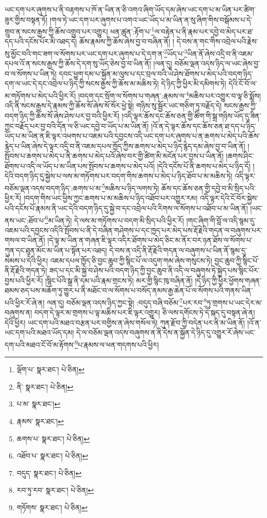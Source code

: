 ཡང་དག་པར་ཞུགས་པ་ནི་བརྟགས་པ་ཁོ་ན་ཡིན་ན་ཅི་འགའ་ཞིག་ཡོད་དམ་ཞེས་ཡང་དག་པ་མ་ཡིན་པར་ཚིག་ཟུར་གྱིས་བསྟན་ཏོ། །གལ་ཏེ་ཡང་དག་པར་ཞུགས་པ་འགའ་ཡང་ཡོད་པ་མ་ཡིན་ན་སུ་ཞིག་གིས་བསྒོམས་པ་དེ་གྲུབ་ན་སངས་རྒྱས་ཀྱི་ཆོས་འགྲུབ་པར་འགྱུར། ཕན་ཚུན་:རྟོག་པ་\footnote{ལྡོག་པ་  སྣར་ཐང་།  པེ་ཅིན། }ལ་བརྟེན་པ་ནི་རྣམ་པར་དབྱེ་བ་མེད་པར་ཐ་དད་པའི་དངོས་པོར་མི་འཐད་དེ། ཆོས་རྣམས་ཀྱི་ཆོས་ཞེས་བྱ་བ་བཞིན་ནོ། །
དེ་བས་ན་གང་གིས་འབྲེལ་པའི་རྗེས་སུ་མྱོང་བའི་གང་ཟག་ལ་སོགས་པར་ཡང་དག་པར་ཞུགས་པ་དེ་དག་ན་\footnote{ནི་  སྣར་ཐང་།  པེ་ཅིན། }ཡོད་པ་\footnote{པ་མ་  སྣར་ཐང་། }ཡིན་ནོ་ཞེས་འདྲི་བ་ནི་འཇམ་དཔལ་འོ་ན་སངས་རྒྱས་ཀྱི་ཆོས་དེ་དག་སུ་ཡོད་ཅེས་བྱ་བ་ཡིན་ནོ། །ལན་དུ། བཅོམ་ལྡན་འདས་ཉིད་ལ་ཡང་ཞེས་བྱ་བ་ལ་སོགས་པ་ཡིན་ཏེ། དབང་ཕྱུག་དམ་པ་སྐྱོན་མ་ལུས་པ་དང་བྲལ་བའི་ཡེ་ཤེས་ཐོགས་པ་མེད་པའི་བདག་ཉིད་དག་ལ་ཡང་དེ་དང་འབྲེལ་པ་ཉིད་ཀྱི་སངས་རྒྱས་ཀྱི་ཆོས་མ་མཆིས་ཏེ། དེ་ཉིད་ཀྱི་ཕྱིར་མི་དམིགས་ཏེ། དེའི་ངོ་བོ་ལ་མ་གཏོགས་པ་མེད་པའི་ཕྱིར་རོ། །བདག་དང་སྲོག་ལ་སོགས་པ་གཞན་:རྣམས་ལ་\footnote{རྣམས་  སྣར་ཐང་། }མཆིས་པར་འགྱུར་བ་ལྟ་ཅི་སྨོས། འདི་ནི་སངས་རྒྱས་དེ་རྣམས་ཀྱི་ཆོས་སོ་ཞེས་སོ་སོར་ཕྱེ་སྟེ། གཉིས་སུ་སྦྱོར་ཡང་གཅིག་ཏུ་བརྗོད་དེ། སངས་རྒྱས་ཀྱི་བདག་ཉིད་ཀྱི་ཆོས་སོ་ཞེས་ཤེས་པར་བྱ་བའི་ཕྱིར་རོ། །འདི་ལྟར་ཆོས་དང་ཆོས་ཅན་གྱི་ཚིག་གི་སྒྲ་གཉིས་ཡོད་དུ་ཟིན་ཀྱང་བརྗོད་པར་བྱ་བའི་དོན་ལ་ཅི་ཡང་དབྱེ་བ་ཡོད་པ་མ་ཡིན་ནོ། །འོ་ན་དེ་ལྟར་ཆོས་དང་ཆོས་ཅན་ཐ་དད་པ་ཉིད་ཡོད་པ་མ་ཡིན་ན་ཇི་ལྟར་འཕགས་པ་འཇམ་པའི་དབྱངས་འདི་ཡང་དག་པར་ཞུགས་པ་ན་ཆགས་པ་མེད་པའི་ཆོས་རྙེད་པ་ཡིན་ཞེས་དེ་ལྟར་འདྲི་བ་ནི་འཇམ་དཔལ་ཁྱོད་ཀྱིས་ཆགས་པ་མེད་པ་ཉིད་རྙེད་དམ་ཞེས་བྱ་བ་ཡིན་ནོ། །སྤོབས་པ་ཆགས་པ་མེད་པ་ནི་ཆགས་པ་མེད་པའོ་ཞེས་བར་གྱི་ཚིག་མི་མངོན་པར་བྱས་པ་ཡིན་ནོ། །ཆགས་ཤིང་ཐོགས་པ་འདི་ལ་ཡོད་པ་མ་ཡིན་པས་སྤོབས་པ་ཆགས་པ་མེད་པའོ། །དེའི་དངོས་པོ་ནི་ཆགས་པ་མེད་པ་ཉིད་དོ། །དེའི་བདག་ཉིད་དུ་སྐྱེས་པ་ལས་མ་གཏོགས་པར་བདག་གིས་ཆགས་པ་མེད་པ་ཉིད་ཐོབ་པ་མ་མཆིས་ཏེ། འདི་ལྟར་བཅོམ་ལྡན་འདས་བདག་ཉིད་:ཆགས་པ་མ་\footnote{ཆགས་པ་  སྣར་ཐང་།  པེ་ཅིན། }མཆིས་པ་ཉིད་ལགས་ཏེ། ཆོས་དང་ཆོས་ཅན་གྱི་དབྱེ་བ་མི་སྲིད་པའི་ཕྱིར་རོ། །བདག་གིས་ཡང་ཕྱིས་ཀྱང་ཆགས་པ་མ་མཆིས་པ་ཉིད་འཐོབ་པར་འགྱུར་རམ། འདི་ལྟར་དེའི་ངོ་བོར་སྐྱེས་པའི་དངོས་པོ་རྣམས་ནི་ཡང་དེའི་བདག་ཉིད་དུ་སྐྱེ་བ་དང་འབྲེལ་པའི་རིགས་ལ་སོགས་པ་འཐོབ་པ་མ་ཡིན་ནོ། །ཡང་ནས་ཡང་:ཐོབ་པ་\footnote{འཐོབ་པ་  སྣར་ཐང་།  པེ་ཅིན། }མ་ཡིན་ཏེ། དེ་ལས་མ་གཏོགས་པ་བདག་མི་སྲིད་པའི་ཕྱིར་རོ། །གང་ཞིག་གི་བློ་ལ་འདི་སྙམ་དུ་འཇམ་པའི་དབྱངས་འདིའི་སྤོབས་པ་ནི་དེ་བཞིན་གཤེགས་པ་དང་ཁྱད་པར་མེད་པས་རྡོ་རྗེའི་གདན་ལ་བཞུགས་པར་གསལ་བ་ཡིན་ནོ། །དེ་ལྟ་མ་ཡིན་ན་གཞན་ཇི་ལྟར་འདིར་ཐོགས་པ་མེད་ཅིང་མ་ནོར་བར་ཉན་ཐོས་ལ་སོགས་པ་ཀུན་དང་ཐུན་མོང་མ་ཡིན་པ་སྟོན་པར་འཐད། དེ་བས་ན་འདི་ནི་རྡོ་རྗེའི་གདན་ལ་བཞུགས་པ་ཡིན་ནོ་སྙམ་དུ་སེམས་པ་དེའི་ཕྱིར། འཇམ་དཔལ་ཁྱོད་ཅི་བྱང་ཆུབ་ཀྱི་སྙིང་པོ་ལ་འདུག་གམ་ཞེས་གསུངས་ཏེ། བྱང་ཆུབ་ཀྱི་སྙིང་པོ་ནི་རྡོ་རྗེའི་གདན་ཏེ། ཟད་པ་དང་མི་སྐྱེ་བ་ཤེས་པའི་བདག་ཉིད་ཀྱི་བྱང་ཆུབ་ནི་འདི་ལ་བཞུགས་ཏེ་སྐྱེད་པས་སྙིང་པོར་བྱས་པའི་ཕྱིར་རོ། །སྙིང་པོའི་སྒྲ་ནི་དམ་པའི་རྣམ་གྲངས་ཏེ། མར་གྱི་སྙིང་ཁུ་བཞིན་ནོ། །དེ་ཉིད་ཀྱི་ཕྱིར་ཕྱོགས་གཞན་ཐམས་ཅད་པས་མཆོག་ཏུ་གྱུར་པ་ནི་མཐོང་བ་ལ་སོགས་པ་བསོད་ནམས་རྒྱ་ཆེན་པོ་ལ་སོགས་པའི་གནས་ཡིན་པའི་ཕྱིར་རོ་ཞེ་ན། ལན་དུ། བཅོམ་ལྡན་འདས་ཉིད་ཀྱང་སྟེ། :བདུད་བཞི་བཅོམ་\footnote{བདུད་  སྣར་ཐང་།  པེ་ཅིན། }པར་རབ་\footnote{རབ་ཏུ་རབ་  སྣར་ཐང་།  པེ་ཅིན། }ཏུ་གྲགས་པ་ཡང་དེར་མ་བཞུགས་ན། བདག་དེ་ལྟར་མ་གྲགས་པ་ལྟ་མཆིས་པར་ཇི་ལྟར་འགྱུར། ཅི་ལས་དགོངས་ཏེ་དེ་སྐད་དུ་བསྟན་ཞེ་ན། དེའི་ཕྱིར། ཡང་དག་པའི་མཐའ་བརྩན་པར་བགྱིས་ན་ཞེས་གསོལ་ཏེ། ཀུན་རྫོབ་ཀྱི་བདེན་པར་ནི་མ་ཡིན་ནོ། །འོ་ན་ཡང་དག་པའི་མཐའ་ཡོད་དམ། དེ་ལ་བཅོམ་ལྡན་འདས་བཞུགས་ན་ནི་དེས་ན་སྐྱོན་དེ་ཉིད་དུ་འགྱུར་རོ་ཞེས་ཡང་དག་པའི་མཐའ་ངོ་བོ་མ་རྟོགས་\footnote{གཏོགས་  སྣར་ཐང་།  པེ་ཅིན། }པ་རྣམས་ལ་ཕན་གདགས་པའི་ཕྱིར། 